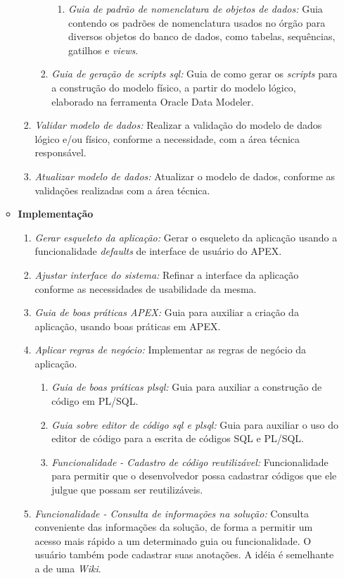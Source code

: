 \begin{itemize}
\begin{itemize}
\begin{enumerate}
\begin{enumerate}
\begin{enumerate}
\item \textit{Guia de padrão de nomenclatura de objetos de dados:} Guia contendo os padrões de nomenclatura usados no órgão para diversos objetos do banco de dados, como tabelas, sequências, gatilhos e \textit{views}.
\end{enumerate}
\item \textit{Guia de geração de scripts sql:} Guia de como gerar os \textit{scripts} para a construção do modelo físico, a partir do modelo lógico, elaborado na ferramenta Oracle Data Modeler.
\end{enumerate}
\item \textit{Validar modelo de dados:} Realizar a validação do modelo de dados lógico e/ou físico, conforme a necessidade, com a área técnica responsável.
\item \textit{Atualizar modelo de dados:} Atualizar o modelo de dados, conforme as validações realizadas com a área técnica.
\end{enumerate}
\item \textbf{Implementação}
\begin{enumerate}
\item \textit{Gerar esqueleto da aplicação:} Gerar o esqueleto da aplicação usando a funcionalidade \textit{defaults} de interface de usuário do APEX.
\item \textit{Ajustar interface do sistema:} Refinar a interface da aplicação conforme as necessidades de usabilidade da mesma.
\item \textit{Guia de boas práticas APEX:} Guia para auxiliar a criação da aplicação, usando boas práticas em APEX.
\item \textit{Aplicar regras de negócio:} Implementar as regras de negócio da aplicação.
\begin{enumerate}
\item \textit{Guia de boas práticas plsql:} Guia para auxiliar a construção de código em PL/SQL.
\item \textit{Guia sobre editor de código sql e plsql:} Guia para auxiliar o uso do editor de código para a escrita de códigos SQL e PL/SQL.
\item \textit{Funcionalidade - Cadastro de código reutilizável:} Funcionalidade para permitir que o desenvolvedor possa cadastrar códigos que ele julgue que possam ser reutilizáveis.
\end{enumerate}
\item \textit{Funcionalidade - Consulta de informações na solução:} Consulta conveniente das informações da solução, de forma a permitir um acesso mais rápido a um determinado guia ou funcionalidade. O usuário também pode cadastrar suas anotações. A idéia é semelhante a de uma \textit{Wiki}.

\end{enumerate}
\end{itemize}
\end{itemize}
